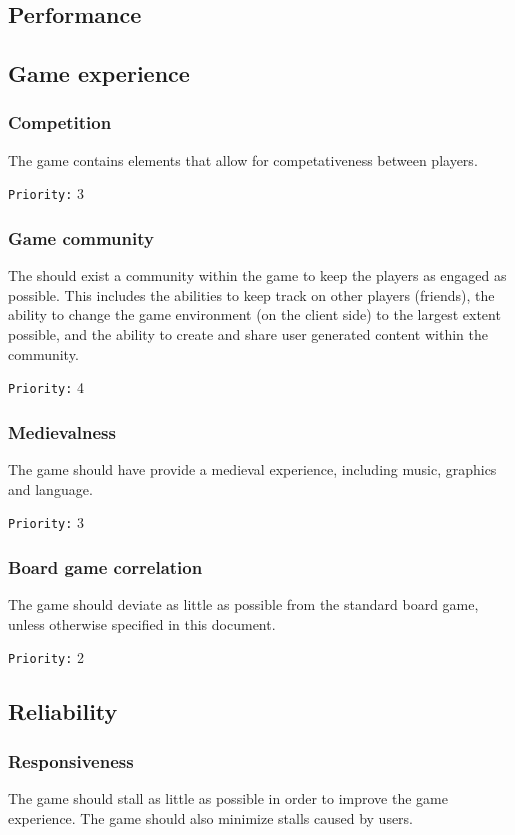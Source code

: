 \documentclass[a4paper,10pt]{article}
\newcommand{\prio}[1]{\texttt{Priority:} #1}
\begin{document}
\subsection{Performance}

\subsection{Game experience}
\subsubsection{Competition}
The game contains elements that allow for competativeness between players.

\prio{3}

\subsubsection{Game community}
The should exist a community within the game to keep the players as engaged as possible. This includes the abilities to keep track on other players (friends), the ability to change the game environment (on the client side) to the largest extent possible, and the ability to create and share user generated content within the community.

\prio{4}

\subsubsection{Medievalness}
The game should have provide a medieval experience, including music, graphics and language.

\prio{3}

\subsubsection{Board game correlation}
The game should deviate as little as possible from the standard board game, unless otherwise specified in this document.

\prio{2}

\subsection{Reliability}
\subsubsection{Responsiveness}
The game should stall as little as possible in order to improve the game experience. The game should also minimize stalls caused by users.
\end{document}
